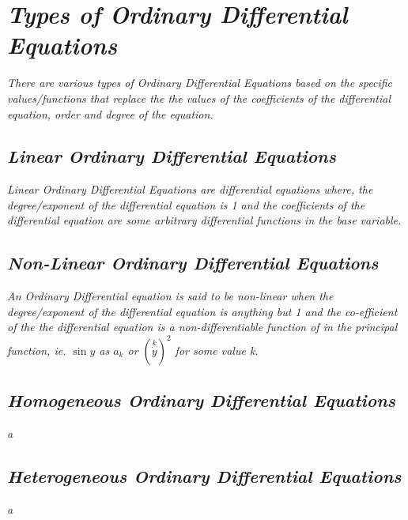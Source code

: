

\section{\textit{Types of Ordinary Differential Equations}}
	
	\textit{There are various types of Ordinary Differential Equations based on the specific values/functions that replace the the values of the coefficients of the differential equation, order and degree of the equation.}	
	
	\subsection{\textit{Linear Ordinary Differential Equations}}

		\textit{Linear Ordinary Differential Equations are differential equations where, the degree/exponent of the differential equation is 1 and the coefficients of the differential equation are some arbitrary differential functions in the base variable.}

	\subsection{\textit{Non-Linear Ordinary Differential Equations}}

		\textit{An Ordinary Differential equation is said to be  non-linear when the degree/exponent of the differential equation is anything but 1 and the co-efficient of the the differential equation is a non-differentiable function of in the principal function, ie. $\sin{y}$ as $a_k$ or $\left(\overset{k}{\dot{y}}\right)^2$ for some value k.}

	\subsection{\textit{Homogeneous Ordinary Differential Equations}}

		\textit{a}

	\subsection{\textit{Heterogeneous Ordinary Differential Equations}}

	\textit{a}


